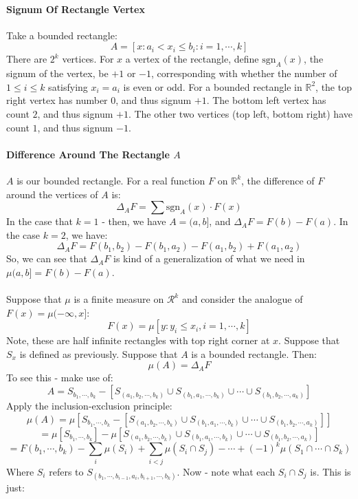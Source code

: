 \documentclass[12pt,a4paper]{article}
\newcommand{\1}[1]{\mathbbm{1}\left\{ #1 \right\}}
\newcommand{\R}{\mathbb{R}}
\newcommand{\rcal}{\mathcal{R}}
\newcommand{\sgn}{\text{sgn}}
\begin{document}
\paragraph{Signum Of Rectangle Vertex} Take a bounded rectangle:
$$
	A = \left[x: a_i < x_i \leq b_i : i = 1, \cdots, k\right]
$$
There are $2^k$ vertices. For $x$ a vertex of the rectangle, define $\sgn_A(x)$, the signum of the vertex, be $+1$ or $-1$, corresponding with whether the number of $1 \leq i \leq k$ satisfying $x_i = a_i$ is even or odd. For a bounded rectangle in $\R^2$, the top right vertex has number $0$, and thus signum $+1$. The bottom left vertex has count $2$, and thus signum $+1$. The other two vertices (top left, bottom right) have count $1$, and thus signum $-1$.

\paragraph{Difference Around The Rectangle $A$} $A$ is our bounded rectangle. For a real function $F$ on $\R^k$, the difference of $F$ around the vertices of $A$ is:
$$
	\Delta_A F = \sum \sgn_A(x) \cdot F(x)
$$
In the case that $k = 1$ - then, we have $A = (a,b]$, and $\Delta_A F = F(b) - F(a)$. In the case $k = 2$, we have:
$$
	\Delta_A F = F(b_1,b_2) - F(b_1,a_2) - F(a_1,b_2) + F(a_1,a_2)
$$
So, we can see that $\Delta_A F$ is kind of a generalization of what we need in $\mu(a,b] = F(b) - F(a)$.
\\\\
Suppose that $\mu$ is a finite measure on $\rcal^k$ and consider the analogue of $F(x) = \mu(-\infty,x]$:
$$
	F(x) = \mu\left[y: y_i \leq x_i, i = 1, \cdots, k\right]
$$
Note, these are half infinite rectangles with top right corner at $x$. Suppose that $S_x$ is defined as previously. Suppose that $A$ is a bounded rectangle. Then:
$$
	\mu(A) = \Delta_A F
$$
To see this - make use of:
$$
	A = S_{b_1, \cdots, b_k} - 
	\left[S_{(a_1,b_2,\cdots,b_k)} \cup S_{(b_1,a_1,\cdots,b_k)} \cup \cdots \cup S_{(b_1,b_2,\cdots,a_k)}\right]
$$
Apply the inclusion-exclusion principle:
$$
	\mu(A) = \mu\left[S_{b_1, \cdots, b_k} - 
	\left[S_{(a_1,b_2,\cdots,b_k)} \cup S_{(b_1,a_1,\cdots,b_k)} \cup \cdots \cup S_{(b_1,b_2,\cdots,a_k)}\right]\right]
$$
$$
	= \mu\left[S_{b_1, \cdots, b_k}\right] - 
	\mu\left[S_{(a_1,b_2,\cdots,b_k)} \cup S_{(b_1,a_1,\cdots,b_k)} \cup \cdots \cup S_{(b_1,b_2,\cdots,a_k)}\right]
$$
$$
	= F(b_1, \cdots, b_k) - \sum_i \mu(S_i) + \sum_{i < j} \mu(S_i \cap S_j) - \cdots + 
	(-1)^k \mu(S_1 \cap \cdots \cap S_k)
$$
Where $S_i$ refers to $S_{(b_1,\cdots,b_{i-1},a_i,b_{i+1},\cdots,b_k)}$. Now - note what each $S_i \cap S_j$ is. This is just:
\end{document}

